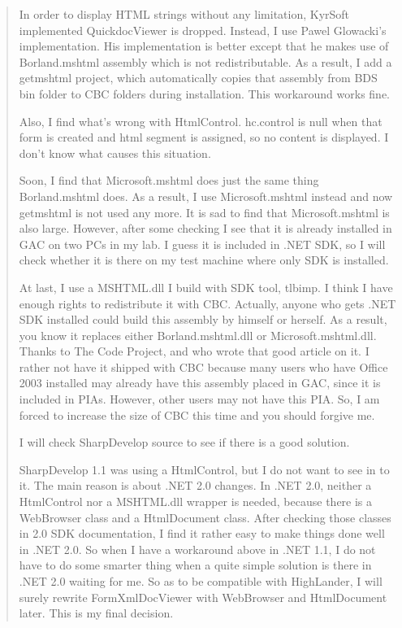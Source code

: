 \begin{itemize}
\begin{quotation}
    In order to display HTML strings without any limitation, KyrSoft
    implemented QuickdocViewer is dropped. Instead, I use Pawel
    Glowacki's implementation. His implementation is better except that
    he makes use of Borland.mshtml assembly which is not redistributable.
    As a result, I add a getmshtml project, which automatically copies
    that assembly from BDS bin folder to CBC folders during installation.
    This workaround works fine.

    Also, I find what's wrong with HtmlControl. hc.control is null when
    that form is created and html segment is assigned, so no content is
    displayed. I don't know what causes this situation.

    Soon, I find that Microsoft.mshtml does just the same thing
    Borland.mshtml does. As a result, I use Microsoft.mshtml instead and
    now getmshtml is not used any more. It is sad to find that
    Microsoft.mshtml is also large. However, after some checking I see that
    it is already installed in GAC on two PCs in my lab. I guess it is
    included in .NET SDK, so I will check whether it is there on my test
    machine where only SDK is installed.

    At last, I use a MSHTML.dll I build with SDK tool, tlbimp. I think I
    have enough rights to redistribute it with CBC. Actually, anyone who
    gets .NET SDK installed could build this assembly by himself or
    herself. As a result, you know it replaces either Borland.mshtml.dll or
    Microsoft.mshtml.dll. Thanks to The Code Project, and who wrote that
    good article on it. I rather not have it shipped with CBC because many
    users who have Office 2003 installed may already have this assembly
    placed in GAC, since it is included in PIAs. However, other users may
    not have this PIA. So, I am forced to increase the size of CBC this
    time and you should forgive me.

    I will check SharpDevelop source to see if there is a good solution.

    SharpDevelop 1.1 was using a HtmlControl, but I do not want to see in
    to it. The main reason is about .NET 2.0 changes. In .NET 2.0, neither
    a HtmlControl nor a MSHTML.dll wrapper is needed, because there is a
    WebBrowser class and a HtmlDocument class. After checking those classes
    in 2.0 SDK documentation, I find it rather easy to make things done
    well in .NET 2.0. So when I have a workaround above in .NET 1.1, I do
    not have to do some smarter thing when a quite simple solution is there
    in .NET 2.0 waiting for me. So as to be compatible with HighLander, I
    will surely rewrite FormXmlDocViewer with WebBrowser and HtmlDocument
    later. This is my final decision.


\end{quotation}
\end{itemize}
